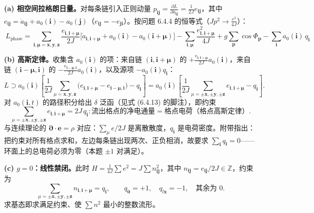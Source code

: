 \textbf{(a) 相空间拉格朗日量。}对每条链引入正则动量 $p_{\pmb{ij}}=\frac{\partial L}{\partial\dot a_{\pmb{ij}}}=\frac{1}{2J}e_{\pmb{ij}}$，其中 $e_{\pmb{ij}}=\dot a_{\pmb{ij}}+a_0(\pmb i)-a_0(\pmb j)$（$e_{\pmb{ij}}=-e_{\pmb{ji}}$）。按问题 6.4.4 的恒等式（$Jp^{2}\to\frac{e^{2}}{4J}$）：
\begin{equation*}
\boxed{\ L_{\text{phase}}=\sum_{\pmb i,\pmb\mu=\pmb x,\pmb y,\pmb z}\frac{e_{\pmb i,\pmb i+\pmb\mu}}{2J}\bigl[\dot a_{\pmb i,\pmb i+\pmb\mu}+a_0(\pmb i)-a_0(\pmb i+\pmb\mu)\bigr]
-\sum_{\pmb i,\pmb\mu}\frac{e_{\pmb i,\pmb i+\pmb\mu}^{2}}{4J}
+g\sum_{\pmb p}\cos\Phi_{\pmb p}
-\sum_{\pmb i}a_0(\pmb i)\,q_{\pmb i}\ }
\end{equation*}

\textbf{(b) 高斯定律。}收集含 $a_0(\pmb i)$ 的项：来自链 $(\pmb i,\pmb i+\pmb\mu)$ 的 $+\frac{e_{\pmb i,\pmb i+\pmb\mu}}{2J}a_0(\pmb i)$，来自链 $(\pmb i-\pmb\mu,\pmb i)$ 的 $-\frac{e_{\pmb i-\pmb\mu,\pmb i}}{2J}a_0(\pmb i)$，以及源项 $-a_0(\pmb i)q_{\pmb i}$：
\begin{equation*}
L\supset a_0(\pmb i)\left[\frac{1}{2J}\sum_{\mu=\pmb x,\pmb y,\pmb z}\bigl(e_{\pmb i,\pmb i+\pmb\mu}-e_{\pmb i-\pmb\mu,\pmb i}\bigr)-q_{\pmb i}\right]
=a_0(\pmb i)\left[\frac{1}{2J}\sum_{\mu=\pm\pmb x,\pm\pmb y,\pm\pmb z}e_{\pmb i,\pmb i+\pmb\mu}-q_{\pmb i}\right] .
\end{equation*}
对 $a_0(\pmb i,t)$ 的路径积分给出 $\delta$ 泛函（见式 (6.4.13) 的脚注），即约束
\begin{equation*}
\boxed{\ \sum_{\mu=\pm\pmb x,\pm\pmb y,\pm\pmb z}e_{\pmb i,\pmb i+\pmb\mu}=2J\,q_{\pmb i} :
\text{流出格点的净电通量}=\text{格点电荷（格点高斯定律）}.\ }
\end{equation*}
与连续理论的 $\pmb\partial\cdot\pmb e=\rho$ 对应：$\sum_\mu e/2J$ 是离散散度，$q_{\pmb i}$ 是电荷密度。附带指出：把约束对所有格点求和，左边每条链出现两次、正负相消，故要求 $\sum_{\pmb i}q_{\pmb i}=0$——环面上的总电荷必须为零（本题 $\pm1$ 对满足）。

\textbf{(c) $g=0$：线性禁闭。}此时 $H=\frac{1}{4J}\sum e^{2}=J\sum n_{\pmb{ij}}^{2}$，其中 $n_{\pmb{ij}}=e_{\pmb{ij}}/2J\in\mathbb{Z}$，约束为
\begin{equation*}
\sum_{\mu=\pm\pmb x,\pm\pmb y,\pm\pmb z}n_{\pmb i,\pmb i+\pmb\mu}=q_{\pmb i},
\qquad
q_{\pmb 0}=+1,\quad q_{l\pmb x}=-1,\quad\text{其余为 }0 .
\end{equation*}
求基态即求满足约束、使 $\sum n^{2}$ 最小的整数流形。

